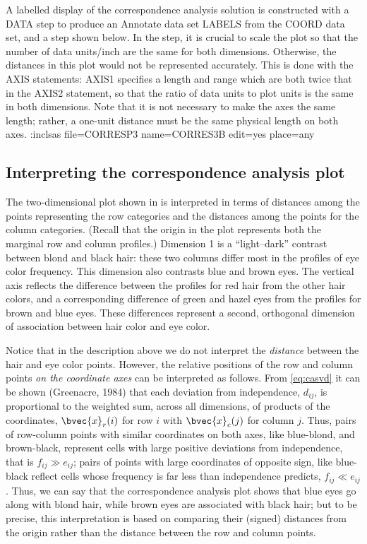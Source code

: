 A labelled  display of the correspondence analysis solution
is constructed with a DATA step to produce an Annotate data set LABELS from
the COORD data set,
and a  step shown below.
In the  step, it is crucial
to scale the plot so that the number of
data units/inch are the same for both dimensions.
Otherwise, the distances in this
plot would not be represented accurately.
This is done
with the AXIS statements: AXIS1 specifies a length and
range which are both twice that in the AXIS2 statement, so that
the ratio of data units to plot units is the same in both
dimensions.
Note that it is not necessary to make the axes the same length;
rather, a one-unit distance must be the same physical length
on both axes.
:inclsas file=CORRESP3 name=CORRES3B edit=yes place=any

\subsection{Interpreting the correspondence analysis plot}
The two-dimensional plot shown in 
is interpreted in terms of distances among the points representing
the row categories and the distances among the points for
the column categories.
(Recall that the origin in the plot represents both the marginal
row and column profiles.)
Dimension 1 is a ``light--dark''
contrast between blond and black hair: these two columns differ
most in the profiles of eye color frequency.
This dimension also contrasts blue and brown eyes.
The vertical axis reflects the difference between the profiles
for red hair from the other hair colors, and a corresponding
difference of
green and hazel eyes from the profiles for brown and blue eyes.
These differences represent
a second, orthogonal
dimension of association between hair color and eye color.

Notice that in the description above we do not interpret
the \emph{distance}
between the hair and eye color points.
However, the relative positions of the row and column points
\emph{on the coordinate axes} can be interpreted as follows.
From \eqref{eq:casvd} it can be shown (Greenacre, 1984)
that
each deviation from independence, \(d_{ij}\),
is proportional to the weighted sum, across all dimensions,
of products of the coordinates,
\(\bvec{x}_{r} ( i )\) for row \(i\)
with \(\bvec{x}_{c} ( j )\) for column \(j\).
Thus, pairs of row-column points
with similar coordinates on both axes,
like blue-blond, and brown-black,
represent cells with large positive deviations from independence,
that is \(f_{ij} \gg e_{ij}\);
pairs of
points with large coordinates of opposite sign, like blue-black
reflect cells whose frequency is far less than independence predicts,
\(f_{ij} \ll e_{ij}\).
Thus, we can say that the correspondence analysis plot shows that
blue eyes go along
with blond hair, while brown eyes are associated with black hair;
but to be precise, this interpretation
is based on comparing their (signed) distances from the
origin rather than the distance between the row and column points.


